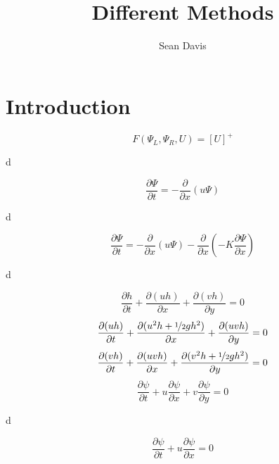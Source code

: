 \documentclass[11pt]{article}
\title{
Different Methods
}
\author{
   Sean Davis %
 }
\begin{document}
\maketitle


\section{Introduction}

\[
F\left(\Psi_L,\Psi_R,U\right) = [U]^+
\]

d

\[
\frac{\partial \Psi}{\partial t} = -\frac{\partial}{\partial x}(u\Psi)
\]

d

\[
\frac{\partial \Psi}{\partial t} = -\frac{\partial}{\partial x}(u\Psi)-\frac{\partial}{\partial x}\left(-K\frac{\partial \Psi}{\partial x}\right)
\]

d

\[
\frac{\partial h}{\partial t} + \frac{\partial(uh)}{\partial x} + \frac{\partial(vh)}{\partial y} = 0
\] \[
\frac{\partial (uh)}{\partial t} + \frac{\partial(u^2h+\nicefrac{1}{2} g h^2)}{\partial x} + \frac{\partial(uvh)}{\partial y} = 0
\] \[
\frac{\partial (vh)}{\partial t} + \frac{\partial(uvh)}{\partial x}+ \frac{\partial(v^2h+\nicefrac{1}{2} g h^2)}{\partial y}  = 0
\]
\[
\frac{\partial \psi}{\partial t} + u\frac{\partial \psi}{\partial x} + v\frac{\partial \psi}{\partial y} = 0
\]

d

\[
\frac{\partial \psi}{\partial t} + u\frac{\partial \psi}{\partial x}  = 0
\]
\end{document}
